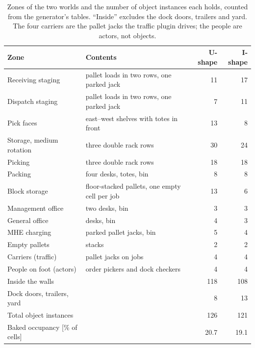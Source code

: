 \documentclass[11pt,a4paper,notitlepage]{report}
\begin{document}
\begin{table}[htbp]
\centering
\caption{Zones of the two worlds and the number of object instances each
holds, counted from the generator's tables. ``Inside'' excludes the dock doors,
trailers and yard. The four carriers are the pallet jacks the traffic plugin
drives; the people are actors, not objects.}
\label{tab:zones}
\small
\begin{tabularx}{\textwidth}{>{\raggedright\arraybackslash}p{}>{\raggedright\arraybackslash}Xrr}
\toprule
Zone & Contents & U-shape & I-shape \\
\midrule
Receiving staging & pallet loads in two rows, one parked jack & 11 & 17 \\
Dispatch staging & pallet loads in two rows, one parked jack & 7 & 11 \\
Pick faces & east--west shelves with totes in front & 13 & 8 \\
Storage, medium rotation & three double rack rows & 30 & 24 \\
Picking & three double rack rows & 18 & 18 \\
Packing & four desks, totes, bin & 8 & 8 \\
Block storage & floor-stacked pallets, one empty cell per job & 13 & 6 \\
Management office & two desks, bin & 3 & 3 \\
General office & desks, bin & 4 & 3 \\
MHE charging & parked pallet jacks, bin & 5 & 4 \\
Empty pallets & stacks & 2 & 2 \\
Carriers (traffic) & pallet jacks on jobs & 4 & 4 \\
People on foot (actors) & order pickers and dock checkers & 4 & 4 \\
\midrule
Inside the walls & & 118 & 108 \\
Dock doors, trailers, yard & & 8 & 13 \\
Total object instances & & 126 & 121 \\
\midrule
Baked occupancy [\si{\percent} of cells] & & 20.7 & 19.1 \\
\bottomrule
\end{tabularx}
\end{table}
\end{document}
